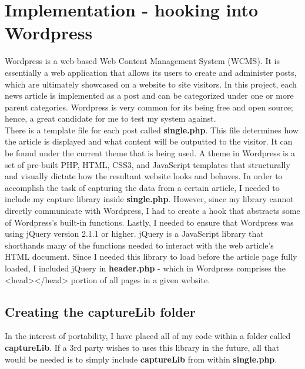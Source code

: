 \documentclass[12pt]{article}
\begin{document}
\section{Implementation - hooking into Wordpress}
Wordpress is a web-based Web Content Management System (WCMS). It is essentially a web application that allows its users to create and administer posts, which are ultimately showcased on a website to site visitors. In this project, each news article is implemented as a post and can be categorized under one or more parent categories. Wordpress is very common for its being free and open source; hence, a great candidate for me to test my system against. \\
There is a template file for each post called \textbf{single.php}. This file determines how the article is displayed and what content will be outputted to the visitor. It can be found under the current theme that is being used. A theme in Wordpress is a set of pre-built PHP, HTML, CSS3, and JavaScript templates that structurally and visually dictate how the resultant website looks and behaves. In order to accomplish the task of capturing the data from a certain article, I needed to include my capture library inside \textbf{single.php}. However, since my library cannot directly communicate with Wordpress, I had to create a hook that abstracts some of Wordpress's built-in functions. Lastly, I needed to ensure that Wordpress was using jQuery version 2.1.1 or higher. jQuery is a JavaScript library that shorthands many of the functions needed to interact with the web article's HTML document. Since I needed this library to load before the article page fully loaded, I included jQuery in \textbf{header.php} - which in Wordpress comprises the <head></head> portion of all pages in a given website. 

\newpage 

\subsection{Creating the captureLib folder}
In the interest of portability, I have placed all of my code within a folder called \textbf{captureLib}. If a 3rd party wishes to uses this library in the future, all that would be needed is to simply include \textbf{captureLib} from within \textbf{single.php}. \\
\end{document}
